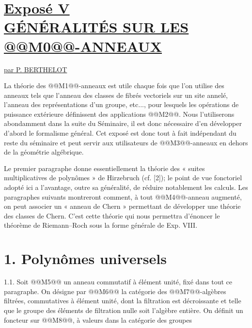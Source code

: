 
\renewcommand{\parf}{\operatorname{parf}}
\section*{\underline{Exposé V}\\[3pt] \underline{\underline{GÉNÉRALITÉS SUR LES @@M0@@-ANNEAUX}}}
\begin{center}
\underline{par P. BERTHELOT}
\end{center}

La théorie des @@M1@@-anneaux est utile chaque fois que l'on utilise des anneaux tels que l'anneau des classes de fibrés vectoriels sur un site annelé, l'anneau des représentations d'un groupe, etc..., pour lesquels les opérations de puissance extérieure définissent des applications @@M2@@. Nous l'utiliserons abondamment dans la suite du Séminaire, il est donc nécessaire d'en développer d'abord le formalisme général. Cet exposé est donc tout à fait indépendant du reste du séminaire et peut servir aux utilisateurs de @@M3@@-anneaux en dehors de la géométrie algébrique.

Le premier paragraphe donne essentiellement la théorie des « suites multiplicatives de polynômes » de Hirzebruch (cf. [2]); le point de vue fonctoriel adopté ici a l'avantage, outre sa généralité, de réduire notablement les calculs. Les paragraphes suivants montreront comment, à tout @@M4@@-anneau augmenté, on peut associer un « anneau de Chern » permettant de développer une théorie des classes de Chern. C'est cette théorie qui nous permettra d'énoncer le théorème de Riemann--Roch sous la forme générale de Exp. VIII.

\section*{1. Polynômes universels}

1.1. Soit @@M5@@ un anneau commutatif à élément unité, fixé dans tout ce paragraphe. On désigne par @@M6@@ la catégorie des @@M7@@-algèbres filtrées, commutatives à élément unité, dont la filtration est décroissante et telle que le groupe des éléments de filtration nulle soit l'algèbre entière. On définit un foncteur sur @@M8@@, à valeurs dans la catégorie des groupes 
